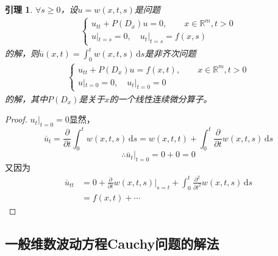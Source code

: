 \documentclass[11pt, a4paper]{article}
\theoremstyle{theorem}
\newtheorem{lemma}[thm]{引理}
\newcommand{\intd}[1]{\,\mathrm{d}{#1}}
\begin{document}
\begin{lemma}
$\forall s \geq 0$，设$u = w(x,t,s)$是问题
\begin{align}
\begin{cases}
u_{tt} + P(D_x) u = 0, \quad \quad x \in \mathbb{R}^m, t > 0 \\
u|_{t=s} = 0, \quad u_t|_{t=s} = f(x,s)
\end{cases}
\end{align}
的解，则$\overline{u}(x,t) = \int_0^t w(x,t,s) \intd s$是非齐次问题
\begin{align}
    \begin{cases}
    u_{tt} + P(D_x) u = f(x,t), \quad \quad x \in \mathbb{R}^m, t > 0 \\
    u|_{t=0} = 0, \quad u_t|_{t=0} = 0
    \end{cases}
\end{align}
的解，其中$P(D_x)$是关于$x$的一个线性连续微分算子。
\end{lemma}

\begin{proof}
$u_t|_{t = 0} = 0$显然，
$$
\overline{u}_t = \frac{\partial }{\partial t} \int_0^t w(x,t,s) \intd s = w(x,t,t) + \int_0^t \frac{\partial }{\partial t} w(x,t,s) \intd s
$$
$$
\therefore \overline{u}_t|_{t = 0} = 0 + 0 = 0
$$
又因为
\begin{align*}
\overline{u}_{tt} &= 0 + \frac{\partial }{\partial t} w(x,t,s) |_{s = t} + \int_0^t \frac{\partial^2 }{\partial t^2} w(x,t,s) \intd s \\
&= f(x,t) + \cdots
\end{align*}
\end{proof}

\subsection{一般维数波动方程Cauchy问题的解法}
\end{document}
